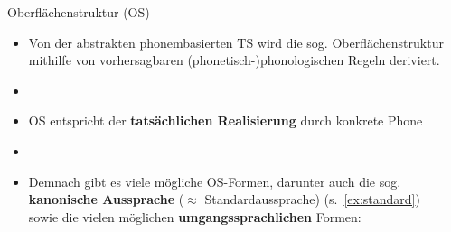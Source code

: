 \begin{frame}{Oberflächenstruktur (OS)}

\begin{itemize}
	\item Von der abstrakten phonembasierten TS wird die sog. Oberflächenstruktur mithilfe von vorhersagbaren (phonetisch-)phonologischen Regeln deriviert.
	\item[]
	\item OS entspricht der \textbf{tatsächlichen Realisierung} durch konkrete Phone \ras \textipa{[ ]}
	\item[]
	\item Demnach gibt es viele mögliche OS-Formen, darunter auch die sog.\\
		\textbf{kanonische Aussprache} ($\approx$ Standardaussprache) (s.~\ref{ex:standard})\\
		sowie die vielen möglichen \textbf{umgangssprachlichen} Formen:

\eal
\ex \label{ex:standard} \textipa{[Pe:b@n]}
\ex \textipa{[Pe:bn]}
\ex \textipa{[Pe:bm]}
\ex \textipa{[Pe:m]}
\zl
\end{itemize}

\end{frame}


